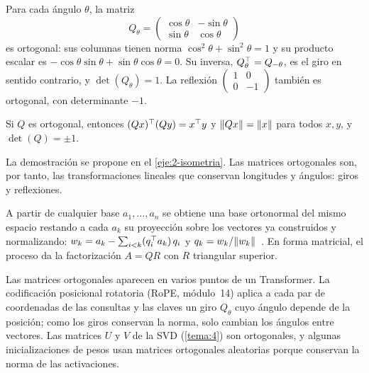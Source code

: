 \begin{ejemplo}\label{ej:giro}
Para cada ángulo $\theta$, la matriz
\[
Q_\theta=\begin{pmatrix}\cos\theta&-\sin\theta\\ \sin\theta&\cos\theta\end{pmatrix}
\]
es ortogonal: sus columnas tienen norma $\cos^{2}\theta+\sin^{2}\theta=1$ y su producto escalar es $-\cos\theta\sin\theta+\sin\theta\cos\theta=0$. Su inversa, $Q_\theta^{\top}=Q_{-\theta}$, es el giro en sentido contrario, y $\det(Q_\theta)=1$. La reflexión $\begin{pmatrix}1&0\\0&-1\end{pmatrix}$ también es ortogonal, con determinante $-1$.
\end{ejemplo}

\begin{proposicion}\label{prop:ortogonal-isometria}
Si $Q$ es ortogonal, entonces $(Qx)^{\top}(Qy)=x^{\top} y$ y $\lVert Qx\rVert=\lVert x\rVert$ para todos $x,y$, y $\det(Q)=\pm 1$.
\end{proposicion}

La demostración se propone en el \cref{eje:2-isometria}. Las matrices ortogonales son, por tanto, las transformaciones lineales que conservan longitudes y ángulos: giros y reflexiones.

\begin{observacion}
A partir de cualquier base $a_1,\dots,a_n$ se obtiene una base ortonormal del mismo espacio restando a cada $a_k$ su proyección sobre los vectores ya construidos y normalizando: $w_k=a_k-\sum_{i<k}(q_i^{\top} a_k)\,q_i$ y $q_k=w_k/\lVert w_k\rVert$~\cite[§4.4]{strang-ila}. En forma matricial, el proceso da la factorización $A=QR$ con $R$ triangular superior.
\end{observacion}

\begin{observacion}
Las matrices ortogonales aparecen en varios puntos de un Transformer. La codificación posicional rotatoria (RoPE, módulo~14) aplica a cada par de coordenadas de las consultas y las claves un giro $Q_\theta$ cuyo ángulo depende de la posición; como los giros conservan la norma, solo cambian los ángulos entre vectores. Las matrices $U$ y $V$ de la SVD (\cref{tema:4}) son ortogonales, y algunas inicializaciones de pesos usan matrices ortogonales aleatorias porque conservan la norma de las activaciones.
\end{observacion}

